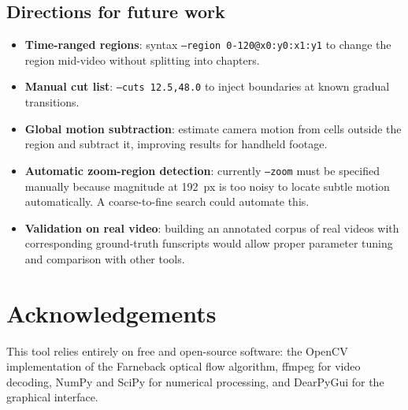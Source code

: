 \documentclass[12pt,a4paper]{article}
\begin{document}
\subsection{Directions for future work}

\begin{itemize}[nosep]
  \item \textbf{Time-ranged regions}: syntax
    \texttt{--region 0-120@x0:y0:x1:y1} to change the region mid-video
    without splitting into chapters.
  \item \textbf{Manual cut list}: \texttt{--cuts 12.5,48.0} to inject
    boundaries at known gradual transitions.
  \item \textbf{Global motion subtraction}: estimate camera motion from
    cells outside the region and subtract it, improving results for handheld
    footage.
  \item \textbf{Automatic zoom-region detection}: currently
    \texttt{--zoom} must be specified manually because magnitude at 192~px is
    too noisy to locate subtle motion automatically. A coarse-to-fine search
    could automate this.
  \item \textbf{Validation on real video}: building an annotated corpus of real
    videos with corresponding ground-truth funscripts would allow proper
    parameter tuning and comparison with other tools.
\end{itemize}

\section*{Acknowledgements}

This tool relies entirely on free and open-source software: the OpenCV
implementation of the Farneback optical flow algorithm, ffmpeg for video
decoding, NumPy and SciPy for numerical processing, and DearPyGui for the
graphical interface.
\end{document}
